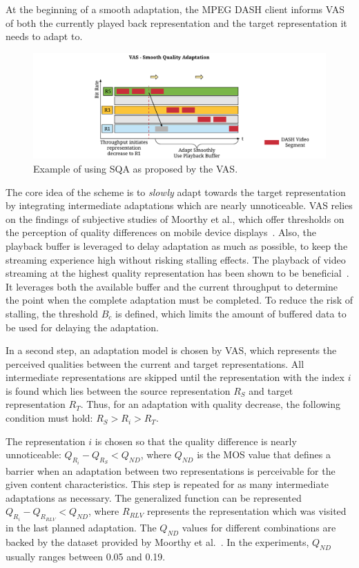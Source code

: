 At the beginning of a smooth adaptation, the \ac{MPEG} \ac{DASH} client informs \ac{VAS} of both the currently played back representation and the target representation it needs to adapt to.
\begin{figure}[tbh!]
\centering
\includegraphics[width=\linewidth]{./gfx/700_VAS/smoothAdapt.pdf}
\caption{Example of using SQA as proposed by the \ac{VAS}.}
\label{fig:720_SmoothAdaptation}
\end{figure}
The core idea of the scheme is to \emph{slowly} adapt towards the target representation by integrating intermediate adaptations which are nearly unnoticeable.
\ac{VAS} relies on the findings of subjective studies of Moorthy et al., which offer thresholds on the perception of quality differences on mobile device displays~\cite{Moorthy2012}.
Also, the playback buffer is leveraged to delay adaptation as much as possible, to keep the streaming experience high without risking stalling effects.
The playback of video streaming at the highest quality representation has been shown to be beneficial~\cite{Hossfeld2014,Moorthy2012}.
It leverages both the available buffer and the current throughput to determine the point when the complete adaptation must be completed.
To reduce the risk of \ac{stalling}, the threshold $B_{c}$ is defined, which limits the amount of buffered data to be used for delaying the adaptation.

In a second step, an adaptation model is chosen by \ac{VAS}, which represents the perceived qualities between the current and target representations. 
All intermediate representations are skipped until the representation with the index $i$ is found which lies between the source representation $R_S$ and target representation $R_T$.
Thus, for an adaptation with quality decrease, the following condition must hold: $R_S > R_i > R_T$.

The representation $i$ is chosen so that the quality difference is nearly unnoticeable: $Q_{R_i} - Q_{R_S}  < Q_{ND}$, where $Q_{ND}$ is the \ac{MOS} value that defines a barrier when an adaptation between two representations is perceivable for the given content characteristics.
This step is repeated for as many intermediate adaptations as necessary. The generalized function can be represented $Q_{R_i} - Q_{R_{RLV}}  < Q_{ND}$, where $R_{RLV}$ represents the representation which was visited in the last planned adaptation.
The $Q_{ND}$ values for different combinations are backed by the dataset provided by Moorthy et al.~\cite{Moorthy2012}. 
In the experiments, $Q_{ND}$ usually ranges between 0.05 and 0.19.

